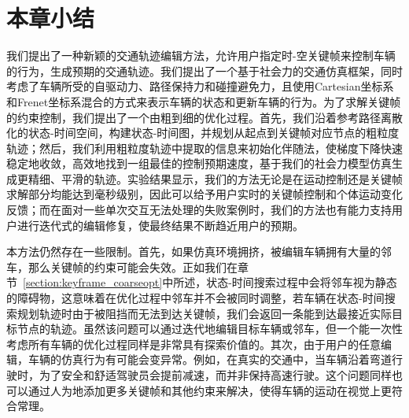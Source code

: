 \section{本章小结}

我们提出了一种新颖的交通轨迹编辑方法，允许用户指定时-空关键帧来控制车辆的行为，生成预期的交通轨迹。我们提出了一个基于社会力的交通仿真框架，同时考虑了车辆所受的自驱动力、路径保持力和碰撞避免力，且使用Cartesian坐标系和Frenet坐标系混合的方式来表示车辆的状态和更新车辆的行为。为了求解关键帧的约束控制，我们提出了一个由粗到细的优化过程。首先，我们沿着参考路径离散化的状态-时间空间，构建状态-时间图，并规划从起点到关键帧对应节点的粗粒度轨迹；然后，我们利用粗粒度轨迹中提取的信息来初始化伴随法，使梯度下降快速稳定地收敛，高效地找到一组最佳的控制预期速度，基于我们的社会力模型仿真生成更精细、平滑的轨迹。实验结果显示，我们的方法无论是在运动控制还是关键帧求解部分均能达到毫秒级别，因此可以给予用户实时的关键帧控制和个体运动变化反馈；而在面对一些单次交互无法处理的失败案例时，我们的方法也有能力支持用户进行迭代式的编辑修复，使最终结果不断趋近用户的预期。


本方法仍然存在一些限制。首先，如果仿真环境拥挤，被编辑车辆拥有大量的邻车，那么关键帧的约束可能会失效。正如我们在章节~\ref{section:keyframe_coarseopt}中所述，状态-时间搜索过程中会将邻车视为静态的障碍物，这意味着在优化过程中邻车并不会被同时调整，若车辆在状态-时间搜索规划轨迹时由于被阻挡而无法到达关键帧，我们会返回一条能到达最接近实际目标节点的轨迹。虽然该问题可以通过迭代地编辑目标车辆或邻车，但一个能一次性考虑所有车辆的优化过程同样是非常具有探索价值的。其次，由于用户的任意编辑，车辆的仿真行为有可能会变异常。例如，在真实的交通中，当车辆沿着弯道行驶时，为了安全和舒适驾驶员会提前减速，而并非保持高速行驶。这个问题同样也可以通过人为地添加更多关键帧和其他约束来解决，使得车辆的运动在视觉上更符合常理。
